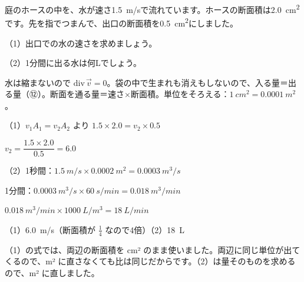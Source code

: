 \begin{reidai}
庭のホースの中を、水が速さ\qty{1.5}{m/s}で流れています。ホースの断面積は\qty{2.0}{cm^2}です。先を指でつまんで、出口の断面積を\qty{0.5}{cm^2}にしました。\par
（1）出口での水の速さを求めましょう。\par
（2）1分間に出る水は何Lでしょう。\par
\kangaekata {}\par
水は縮まないので $\mathrm{div}\,\vec v=0$。袋の中で生まれも消えもしないので、入る量＝出る量（⑫）。断面を通る量＝速さ×断面積。単位をそろえる：$\qty{1}{cm^2}=\qty{0.0001}{m^2}$。\par
\shiki\kviiijs{}\zw{} （1）$v_1A_1=v_2A_2$ より $1.5\times2.0=v_2\times0.5$\par
\kviiijb $v_2=\dfrac{1.5\times2.0}{0.5}=6.0$\par
\kviiija （2）1秒間：$\qty{1.5}{m/s}\times\qty{0.0002}{m^2}=\qty{0.0003}{m^3/s}$\par
\kviiijb 1分間：$\qty{0.0003}{m^3/s}\times\qty{60}{s/min}=\qty{0.018}{m^3/min}$\par
\kviiijb $\qty{0.018}{m^3/min}\times\qty{1000}{L/m^3}=\qty{18}{L/min}$\par
\kotae\kviiijs{}\zw{} （1）\qty{6.0}{m/s}（断面積が $\frac14$ なので4倍）\quad （2）\qty{18}{L}
\end{reidai}

\noindent （1）の式では、両辺の断面積を cm² のまま使いました。両辺に同じ単位が出てくるので、m² に直さなくても比は同じだからです。（2）は量そのものを求めるので、m² に直しました。

